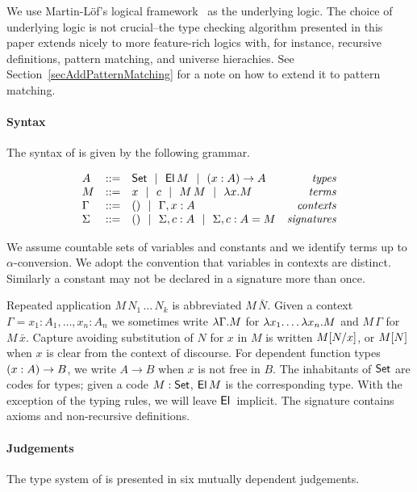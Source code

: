 
We use Martin-L\"of's logical
framework~\cite{nordstroemPeterssonSmith:handbookLICS} as the underlying logic.
%
The choice of underlying logic is not crucial--the type checking algorithm
presented in this paper extends nicely to more feature-rich logics with, for
instance, recursive definitions, pattern matching, and universe hierachies. See
Section~\ref{secAddPatternMatching} for a note on how to extend it to pattern
matching.

\paragraph*{Syntax} The syntax of {\Core} is given by the following grammar.

\[\begin{array}{lclr}
    A	   & ::= & \SET \Or \EL M \Or \PI xAA	      & \mathit{types} \\
    M	   & ::= & x \Or c \Or M\,M \Or \LAM xM	      & \mathit{terms} \\
    \Gamma & ::= & () \Or \Gamma,x:A		      & \mathit{contexts} \\
    \Sigma & ::= & () \Or \Sigma,c:A \Or \Sigma,c:A=M & \mathit{signatures} \\
\end{array}\]

We assume countable sets of variables and constants and we identify terms up to
$\alpha$-conversion. We adopt the convention that variables in contexts are
distinct. Similarly a constant may not be declared in a signature more than
once.

Repeated application $M \, N_1 \, \dots \, N_k$ is abbreviated $M \, \bar N$.
%
Given a context $\Gamma = x_1 : A_1, \ldots, x_n : A_n$ we sometimes write
$\LAM \Gamma M$ for $\LAM {x_1} \ldots \LAM {x_n} M$ and $M \, \Gamma$ for $M
\, \bar x$.
%
Capture avoiding substitution of $N$ for $x$ in $M$ is written $\Subst M x N$,
or $\SubstD M N$ when $x$ is clear from the context of discourse.
%
For dependent function types $\PI xAB$, we write $A \to B$ when $x$ is not free
in $B$.
%
The inhabitants of $\SET$ are codes for types; given a code $M : \SET$, $\EL M$
is the corresponding type. With the exception of the typing rules, we will
leave $\EL{}$ implicit.
%
The signature contains axioms and non-recursive definitions.

\paragraph*{Judgements} The type system of {\Core} is presented in six mutually
dependent judgements.

